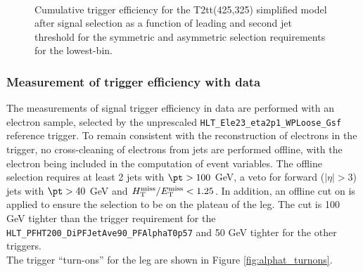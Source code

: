 \begin{figure}[h!]
  \begin{center}
     ~~
     \\
    \caption{
Cumulative trigger efficiency for the T2tt(425,325) simplified model after signal selection as a function of leading and second jet threshold for the symmetric and asymmetric selection requirements for the lowest-\scalht bin.}
    \label{fig:T1ttt_Trigger_Efficiency_DijetAve}
  \end{center} 
\end{figure}



% 
\subsubsection{Measurement of trigger efficiency with data}
\label{sec:trigger_eff_data}
The measurements of signal trigger efficiency in data are performed with an electron sample, selected by the
unprescaled \verb!HLT_Ele23_eta2p1_WPLoose_Gsf! reference trigger. To remain consistent with the reconstruction 
of electrons in the trigger, no cross-cleaning of electrons from jets are performed offline, with
the electron being included in the computation of event variables. 
The offline selection requires at least 2 jets with $\pt > 100$ GeV, a veto for forward ($|\eta|>3$) jets with $\pt > 40$ GeV 
and $\mbox{$\mbox{$H_{\rm T}^{\rm miss}$} / \mbox{$E_\text{T}^{\rm miss}$}$} < 1.25$. In addition, an offline cut on \scalht is applied to ensure the selection to be on the plateau of the \scalht leg. 
The cut is 100 GeV tighter than the trigger requirement for the \verb!HLT_PFHT200_DiPFJetAve90_PFAlphaT0p57! and 50 GeV tighter for the other triggers. \\
The trigger ``turn-ons'' for the \alt leg are shown in Figure \ref{fig:alphat_turnons}.

